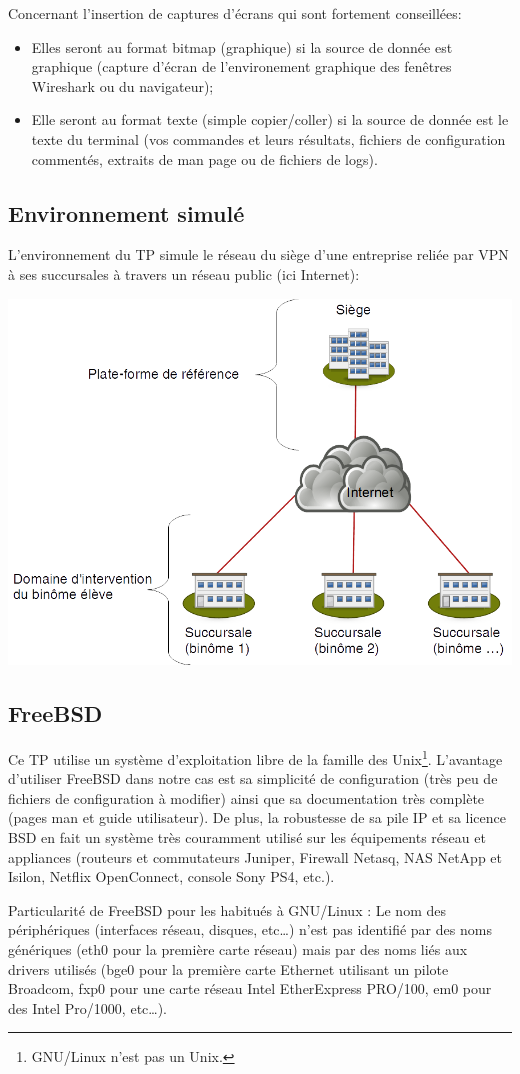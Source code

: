 \documentclass[a4paper,11pt]{article}
\begin{document}
Concernant l'insertion de captures d'écrans qui sont fortement conseillées:
\begin{itemize}
\item Elles seront au format bitmap (graphique) si la source de donnée est graphique (capture d'écran de l'environement graphique des fenêtres Wireshark ou du navigateur);
\item Elle seront au format texte (simple copier/coller) si la source de donnée est le texte du terminal (vos commandes et leurs résultats, fichiers de configuration commentés, extraits de man page ou de fichiers de logs).
\end{itemize}

\subsection{Environnement simulé}
L'environnement du TP simule le réseau du siège d'une entreprise reliée par VPN à ses succursales à travers un réseau public (ici Internet):
\begin{center}
\includegraphics[width=0.6\linewidth]{environnement-simule}
\end{center}
\subsection{FreeBSD}
Ce TP utilise un système d'exploitation libre de la famille des Unix\footnote{GNU/Linux n'est pas un Unix.}. L'avantage d'utiliser FreeBSD dans notre cas est sa simplicité de configuration (très peu de fichiers de configuration à modifier) ainsi que sa documentation très complète (pages man et guide utilisateur). De plus, la robustesse de sa pile IP et sa licence BSD en fait un système très couramment utilisé sur les équipements réseau et appliances (routeurs et commutateurs Juniper, Firewall Netasq, NAS NetApp et Isilon, Netflix OpenConnect, console Sony PS4, etc.).

Particularité de FreeBSD pour les habitués à GNU/Linux : Le nom des périphériques (interfaces réseau, disques, etc…) n'est pas identifié par des noms génériques (eth0 pour la première carte réseau) mais par des noms liés aux drivers utilisés (bge0 pour la première carte Ethernet utilisant un pilote Broadcom, fxp0 pour une carte réseau Intel EtherExpress PRO/100, em0 pour des Intel Pro/1000, etc…).
\end{document}
